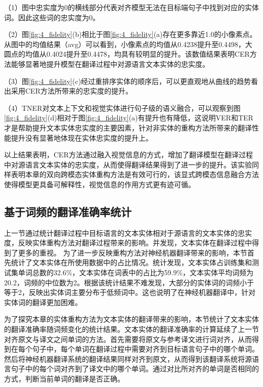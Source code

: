 （1）图中忠实度为0的横线部分代表对齐模型无法在目标端句子中找到对应的实体词。因此这些词的忠实度为0。

（2）图\ref{fig:4_fidelity}(b)相比于图\ref{fig:4_fidelity}(a)存在更多靠近1.0的小像素点。从图中的均值结果（avg）可以看到，小像素点的均值从0.4238提升至0.4498，大圆点的均值从0.4024提升至0.4478，均具有较明显的提升。该数值结果表明CER方法能够显著地提升模型在翻译过程中对源语言文本实体的忠实度。

（3）图\ref{fig:4_fidelity}(c)经过重排序实体的顺序后，可以更直观地从曲线的趋势看出采用CER方法所带来的忠实度的提升。

（4）TNER对文本上下文和视觉实体进行句子级的语义融合，可以观察到图\ref{fig:4_fidelity}(d)相对于图\ref{fig:4_fidelity}(a)有提升也有降低，这说明VER和TER才是帮助提升文本实体忠实度的主要因素，针对非实体的重构方法所带来的翻译性能提升没有显著地体现在实体忠实度的提升上。

以上结果表明，CER方法通过融入视觉信息的方式，增加了翻译模型在翻译过程中对源语言文本实体的忠实度，从而使得翻译结果得到了进一步的提升。该实验同样表明本章的双向跨模态实体重构方法是有效可行的，该显式跨模态信息融合方法使得模型更具备可解释性，视觉信息的作用方式更有迹可循。

\subsection{基于词频的翻译准确率统计}
\label{sec:4_freq_acc}


上一节通过统计翻译过程中目标语言的文本实体相对于源语言的文本实体的忠实度，反映实体重构方法对翻译过程带来的影响。并发现，文本实体在翻译过程中得到了更多的重视。
为了进一步反映重构方法对神经机器翻译带来的影响，本节首先统计了文本实体在所使用数据中的占比情况。统计发现，文本实体占训练集和测试集单词总数的32.6\%，文本实体在词表中的占比为59.9\%，文本实体平均词频为20.2，词频的中位数为2。根据该统计结果不难发现，大部分的实体词的词频小于等于2，反映出实体词主要分布于低频词中。这也说明了在神经机器翻译中，针对实体词的翻译更加困难。

为了探究本章的实体重构方法为文本实体的翻译带来的影响，本节统计了文本实体的翻译准确率随词频变化的统计结果。文本实体的翻译准确率的计算延续了上一节对齐原文与译文之间单词的方法。首先需要将原文与参考译文进行词对齐，从而得到在每个句子中，每个单词在翻译过程中需要对齐到目标语言句子中的哪个单词。然后将神经机器翻译系统的翻译结果同样对齐到原文，从而得到该翻译系统将源语言句子中的每个词对齐到了译文中的哪个单词。通过对比所对齐的单词是否相同的方式，判断当前单词的翻译是否正确。

